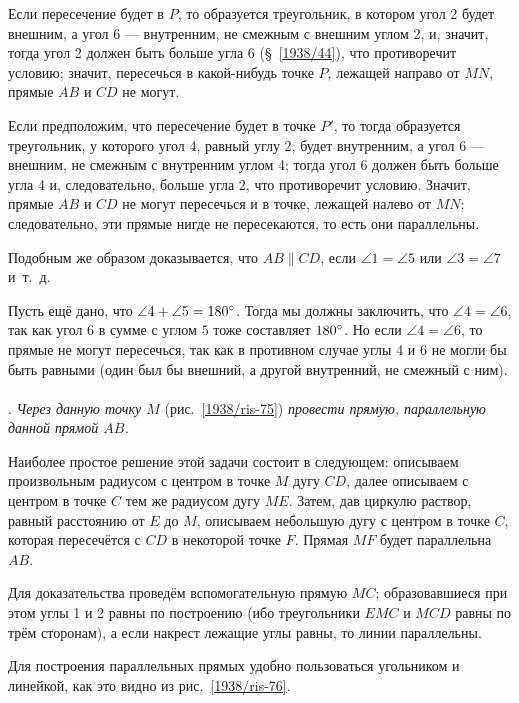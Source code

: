 \documentclass[oneside]{book}
\begin{document}
Если пересечение будет в $P$, то образуется треугольник, в котором угол 2 будет внешним, а угол 6 — внутренним, не смежным с внешним углом 2, и, значит, тогда угол 2 должен быть больше угла 6 (§~\ref{1938/44}), что противоречит условию;
значит, пересечься в какой-нибудь точке $P$, лежащей направо от $MN$, прямые $AB$ и $CD$ не могут.

Если предположим, что пересечение будет в точке $P'$, то тогда образуется треугольник, у которого угол 4, равный углу 2, будет внутренним, а угол 6 — внешним, не смежным с внутренним углом 4;
тогда угол 6 должен быть больше угла 4 и, следовательно, больше угла 2, что противоречит условию.
Значит, прямые $AB$ и $CD$ не могут пересечься и в точке, лежащей налево от $MN$;
следовательно, эти прямые нигде не пересекаются, то есть они параллельны.

Подобным же образом доказывается, что $AB \parallel CD$, если $\angle 1 = \angle 5$ или $\angle 3 = \angle 7$ и~т.~д.

Пусть ещё дано, что $\angle 4 + \angle 5 = 180\degree$.
Тогда мы должны заключить, что $\angle 4 = \angle 6$, так как угол $6$ в сумме с углом $5$ тоже составляет $180\degree$.
Но если $\angle 4 = \angle 6$, то прямые не могут пересечься, так как в противном случае углы 4 и 6 не могли бы быть равными (один был бы внешний, а другой внутренний, не смежный с ним).

\paragraph{}\label{1938/74}
.
\emph{Через данную точку $M$} (рис.~\ref{1938/ris-75}) \emph{провести прямую, параллельную данной прямой $AB$.}

Наиболее простое решение этой задачи состоит в следующем:
описываем произвольным радиусом с центром в точке $M$ дугу $CD$, далее описываем с центром в точке $C$ тем же радиусом дугу $ME$.
Затем, дав циркулю раствор, равный расстоянию от $E$ до $M$, описываем небольшую дугу с центром в точке $C$, которая пересечётся с $CD$ в некоторой точке $F$.
Прямая $MF$ будет параллельна $AB$.

Для доказательства проведём вспомогательную прямую $MC$;
образовавшиеся при этом углы 1 и 2 равны по построению (ибо треугольники $EMC$ и $MCD$ равны по трём сторонам), а если накрест лежащие углы равны, то линии параллельны.

Для построения параллельных прямых удобно пользоваться угольником и линейкой, как это видно из рис.~\ref{1938/ris-76}.
\end{document}
